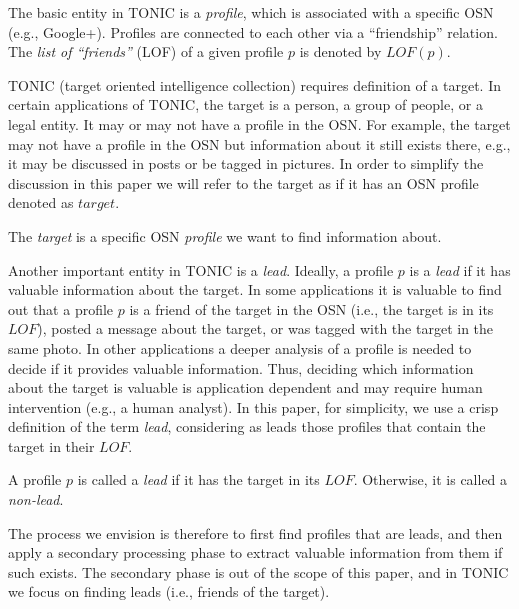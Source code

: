 \documentclass[prodmode,acmtecs]{acmsmall} %
\begin{document}
\begin{definition}[profiles]
The basic entity in TONIC is a {\em profile}, which is associated with a specific OSN (e.g., Google+). Profiles are connected to each other via a ``friendship'' relation.  The {\em list of ``friends''} (LOF) of a given profile $p$ is denoted by $LOF(p)$. 
\label{def:profile}
\end{definition}

TONIC (target oriented intelligence collection) requires definition of a target. 
In certain applications of TONIC, the target is a person, a group of people, or a legal entity. 
It may or may not have a profile in the OSN. For example, the target may not have a profile in the OSN but information about it still exists there, e.g., it may be discussed in posts or be tagged in pictures. 
In order to simplify the discussion in this paper we will refer to the target as if it has an OSN profile denoted as $\mathit{target}$. 


\begin{definition}[Target]
The {\em target} is a specific OSN {\em profile} we want to find information about. 
\label{def:Target}
\end{definition}

Another important entity in TONIC is a {\em lead}. 
Ideally, a profile $p$ is  a {\em lead} if it has valuable information about the target. 
In some applications it is valuable to find out that a profile $p$ is a friend of the target in the OSN (i.e., the target is in its $LOF$), posted a message about the target, or was tagged with the target in the same photo. In other applications a deeper analysis of a profile is needed to decide if it provides valuable information. 
Thus, deciding which information about the target is valuable
is application dependent and may require human intervention (e.g., a human analyst). In this paper, for simplicity, we use a crisp definition of the term {\em lead}, considering as leads those profiles that contain the target in their  \(LOF\).

\begin{definition}
A profile $p$ is called a {\em lead} if it has the target in its \(LOF\). Otherwise, it is called a {\em non-lead}.   
\label{def:lead}
\end{definition}

The process we envision is therefore to first find profiles that are leads, and then apply a secondary processing phase to extract valuable information from them if such exists. The secondary phase is out of the scope of this paper, and in TONIC we focus on finding leads (i.e., friends of the target). 
\end{document}
